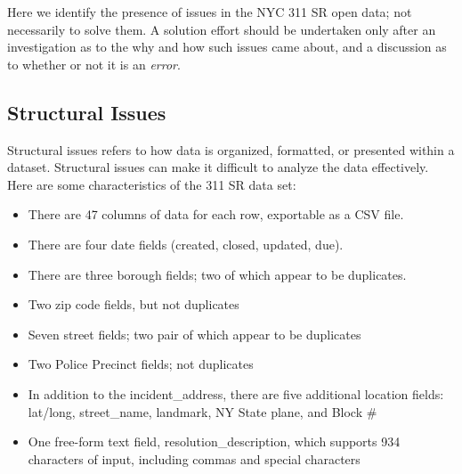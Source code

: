 \documentclass[linenumber]{jdsart}
\begin{document}
Here we identify the presence of issues in the NYC 311 SR open data;
not necessarily to solve them. A solution effort should
be undertaken only after an investigation as to the why and how 
such issues came about, and a discussion as to whether or not it 
is an \textit{error}. 


\subsection{Structural Issues}
\label{sec:structural}

Structural issues refers to how data is organized, formatted, 
or presented within a dataset. Structural issues can make 
it difficult to analyze the data effectively. Here are some 
characteristics of the 311 SR data set:

\begin{itemize}
	\item There are 47 columns of data for each row, exportable as a CSV file.
	
	\item There are four date fields (created, closed, updated, due).
	
	\item There are three borough fields; two of which appear to be duplicates.
	
	\item Two zip code fields, but not duplicates
	
	\item Seven street fields; two pair of which appear to be duplicates
	
	\item Two Police Precinct fields; not duplicates
	
	\item In addition to the incident\_address, there are five additional location fields: 
	lat/long, street\_name, landmark, NY State plane, and Block \#
	
	\item One free-form text field, resolution\_description, which 
	supports 934 characters of input, including commas and special characters
\end{itemize}
\end{document}
